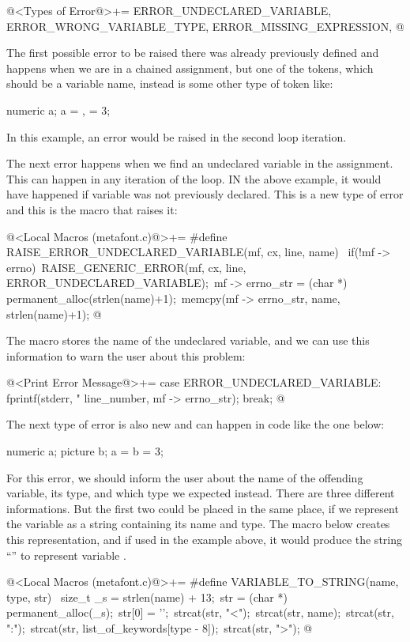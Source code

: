 \iniciocodigo
@<Types of Error@>+=
ERROR_UNDECLARED_VARIABLE, ERROR_WRONG_VARIABLE_TYPE, ERROR_MISSING_EXPRESSION,
@
\fimcodigo

The first possible error to be raised there was already previously
defined and happens when we are in a chained assignment, but one of
the tokens, which should be a variable name, instead is some other
type of token like:

\alinhaverbatim
numeric a;
a = , = 3; %
\alinhanormal

In this example, an error would be raised in the second loop iteration.

The next error happens when we find an undeclared variable in the
assignment. This can happen in any iteration of the loop. IN the above
example, it would have happened if variable  was not
previously declared. This is a new type of error and this is the macro
that raises it:

\iniciocodigo
@<Local Macros (metafont.c)@>+=
#define RAISE_ERROR_UNDECLARED_VARIABLE(mf, cx, line, name) {\
  if(!mf -> errno){\
    RAISE_GENERIC_ERROR(mf, cx, line, ERROR_UNDECLARED_VARIABLE);\
    mf -> errno_str = (char *) permanent_alloc(strlen(name)+1);\
    memcpy(mf -> errno_str, name, strlen(name)+1);}}
@
\fimcodigo

The macro stores the name of the undeclared variable, and we can use
this information to warn the user about this problem:

\iniciocodigo
@<Print Error Message@>+=
case ERROR_UNDECLARED_VARIABLE:
  fprintf(stderr, "%
          line_number, mf -> errno_str);
  break;
@
\fimcodigo

The next type of error is also new and can happen in code like the one
below:

\alinhaverbatim
numeric a;
picture b;
a = b = 3; %
\alinhanormal

For this error, we should inform the user about the name of the
offending variable, its type, and which type we expected
instead. There are three different informations. But the first two
could be placed in the same place, if we represent the variable as a
string containing its name and type. The macro below creates this
representation, and if used in the example above, it would produce the
string ``\monoespaco{<b:picture>}'' to represent
variable \monoespaco{b}.

\iniciocodigo
@<Local Macros (metafont.c)@>+=
#define VARIABLE_TO_STRING(name, type, str) {\
  size_t _s = strlen(name) + 13;\
  str = (char *) permanent_alloc(_s);\
  str[0] = '\0';\
  strcat(str, "<");\
  strcat(str, name);\
  strcat(str, ":");\
  strcat(str, list_of_keywords[type - 8]);\
  strcat(str, ">");}
@
\fimcodigo

